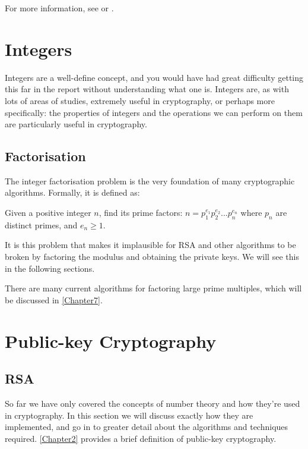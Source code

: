   For more information, see \cite{Rivest:1999aa} or \cite{Gordon:1985aa}.

\section{Integers}

Integers are a well-define concept, and you would have had great difficulty getting this far in the report without understanding what one is. Integers are, as with lots of areas of studies, extremely useful in cryptography, or perhaps more specifically: the properties of integers and the operations we can perform on them are particularly useful in cryptography.

  \subsection{Factorisation}
  
  The integer factorisation problem is the very foundation of many cryptographic algorithms. Formally, it is defined as:
  
  \begin{mathdef}
    Given a positive integer $n$, find its prime factors: $n = p^{e_1}_1p^{e_2}_2...p^{e_n}_n$ where $p_n$ are distinct primes, and $e_n \geq 1$.
  \end{mathdef}
  
  It is this problem that makes it implausible for RSA and other algorithms to be broken by factoring the modulus and obtaining the private keys. We will see this in the following sections.
  
  There are many current algorithms for factoring large prime multiples, which will be discussed in \textsection \ref{Chapter7}.

\section{Public-key Cryptography}

  \subsection{RSA}
  
  So far we have only covered the concepts of number theory and how they're used in cryptography. In this section we will discuss exactly how they are implemented, and go in to greater detail about the algorithms and techniques required. \textsection \ref{Chapter2} provides a brief definition of public-key cryptography.
  
